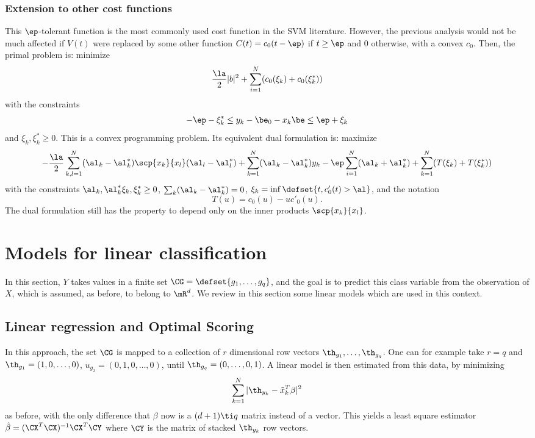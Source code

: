 \subsection{Extension to other cost functions}
This $\ep$-tolerant function is the most commonly used cost function
in the SVM literature. However, the previous analysis would not be much
affected if $V(t)$ were replaced by some other function $C(t) =
c_0(t-\ep)$ if $t\geq \ep$ and 0 otherwise, with a convex
$c_0$. Then, the primal problem is: minimize
$$
\frac{\la}{2} |b|^2 + \sum_{i=1}^N (c_0(\xi_k) + c_0(\xi_k^*))
$$
with the constraints 
$$
-\ep - \xi_k^* \leq y_k - \be_0 - x_k\be \leq \ep+\xi_k
$$
and $\xi_k, \xi_k^* \geq 0$. This is a convex programming problem. Its
equivalent dual formulation is: maximize
$$
- \frac{\la}{2} \sum_{k,l=1}^N (\al_k-\al_k^*)\scp{x_k}{x_l}
(\al_l-\al_l^*) + \sum_{k=1}^N (\al_k-\al_k^*)y_k - \ep \sum_{i=1}^N
(\al_k+\al_k^*) +  \sum_{k=1}^N (T(\xi_k) + T(\xi_k^*))
$$
with the constraints $\al_k, \al_k^*\xi_k, \xi_k^* \geq 0$, $\sum_k (\al_k-\al_k^*)
= 0$, $\xi_k = \inf\defset{t, c'_0(t) > \al}$, and the notation
$$
T(u) = c_0(u) - u c'_0(u).
$$
The dual formulation still has the property to depend only on the
inner products $\scp{x_k}{x_l}$.


\chapter{Models for linear classification}

In this section, $Y$ takes values in a finite set $\CG = \defset{g_1,
\ldots, g_q}$, and the goal is to predict this class variable from the
observation of $X$, which is assumed, as before, to belong to
$\mR^d$. We review in this section some linear models which are used
in this context.

\section{Linear regression and Optimal Scoring}

In this approach, the set $\CG$ is mapped to a collection of $r$
dimensional row vectors $\th_{g_1}, \ldots, \th_{g_q}$. One can for example take $r=q$ and $\th_{g_1} = (1,0,\ldots,0)$,
$u_{g_2} = (0,1,0,\ldots,0)$, until $\th_{g_q} = (0,\ldots,0,1)$. A linear
model is then estimated from this data, by minimizing
$$
\sum_{k=1}^N |\th_{y_k} - \tilde x_k^T\beta|^2
$$ 
as before, with the only difference that $\beta$ now is a $(d+1) \ti
q$ matrix instead of a vector. This yields a least square estimator
$\hat \beta = (\CX^T\CX)^{-1}\CX^T\CY$ where $\CY$ is the
matrix of stacked $\th_{y_k}$ row vectors. 

